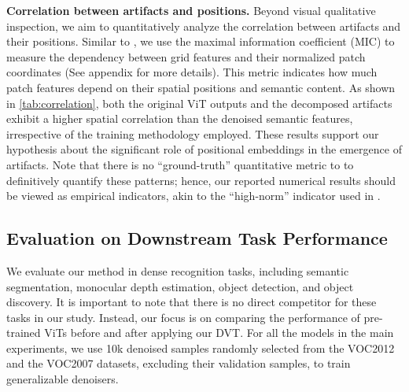 \documentclass[runningheads]{llncs}
\newcommand{\ours}{DVT\xspace}
\renewcommand{\paragraph}[1]{\vspace{1.25mm}\noindent\textbf{#1}}
\begin{document}
\paragraph{Correlation between artifacts and positions.} Beyond visual qualitative inspection, we aim to quantitatively analyze the correlation between artifacts and their positions. Similar to \cite{voita2023neurons}, we use the maximal information coefficient (MIC) to measure the dependency between grid features and their normalized patch coordinates (See appendix for more details). This metric indicates how much patch features depend on their spatial positions and semantic content. As shown in \cref{tab:correlation}, both the original ViT outputs and the decomposed artifacts exhibit a higher spatial correlation than the denoised semantic features, irrespective of the training methodology employed. These results support our hypothesis about the significant role of positional embeddings in the emergence of artifacts. Note that there is no ``ground-truth'' quantitative metric to to definitively quantify these patterns; hence, our reported numerical results should be viewed as empirical indicators, akin to the ``high-norm'' indicator used in \cite{darcet2023vision}.


\subsection{Evaluation on Downstream Task Performance}

We evaluate our method in dense recognition tasks, including semantic segmentation, monocular depth estimation, object detection, and object discovery. It is important to note that there is no direct competitor for these tasks in our study. Instead, our focus is on comparing the performance of pre-trained ViTs before and after applying our \ours. For all the models in the main experiments, we use 10k denoised samples randomly selected from the VOC2012 and the VOC2007 datasets, excluding their validation samples, to train generalizable denoisers.
\end{document}

